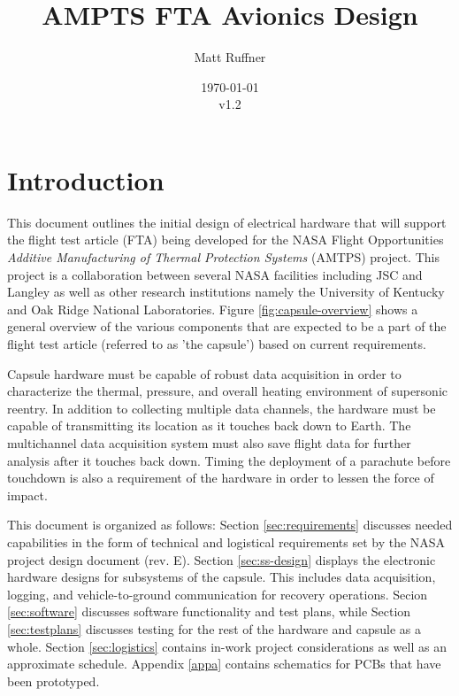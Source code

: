 \documentclass{article}
\title{AMPTS FTA Avionics Design}
\author{Matt Ruffner}
\date{\today\\v1.2}
\newcommand{\ddrev}{E}
\begin{document}
\maketitle
\begin{center}
\end{center}
\tableofcontents \newpage
\listoffigures 
\listoftables \newpage



\section{Introduction}
This document outlines the initial design of electrical hardware that will support the flight test article (FTA) being developed for the NASA Flight Opportunities \textit{Additive Manufacturing of Thermal Protection Systems} (AMTPS) project. This project is a collaboration between several NASA facilities including JSC and Langley as well as other research institutions namely the University of Kentucky and Oak Ridge National Laboratories. Figure \ref{fig:capsule-overview} shows a general overview of the various components that are  expected to be a part of the flight test article (referred to as 'the capsule') based on current requirements.

Capsule hardware must be capable of robust data acquisition in order to characterize the thermal, pressure, and overall heating environment of supersonic reentry. In addition to collecting multiple data channels, the hardware must be capable of transmitting its location as it touches back down to Earth. The multichannel data acquisition system must also save flight data for further analysis after it touches back down. Timing the deployment of a parachute before touchdown is also a requirement of the hardware in order to lessen the force of impact.

This document is organized as follows: Section \ref{sec:requirements} discusses needed capabilities in the form of technical and logistical requirements set by the NASA project design document (rev. \ddrev ). Section \ref{sec:ss-design} displays the electronic hardware designs for subsystems of the capsule. This includes data acquisition, logging, and vehicle-to-ground communication for recovery operations. Secion \ref{sec:software} discusses software functionality and test plans, while Section \ref{sec:testplans} discusses testing for the rest of the hardware and capsule as a whole. Section \ref{sec:logistics} contains in-work project considerations as well as an approximate schedule. Appendix \ref{appa} contains schematics for PCBs that have been prototyped.  
\end{document}
